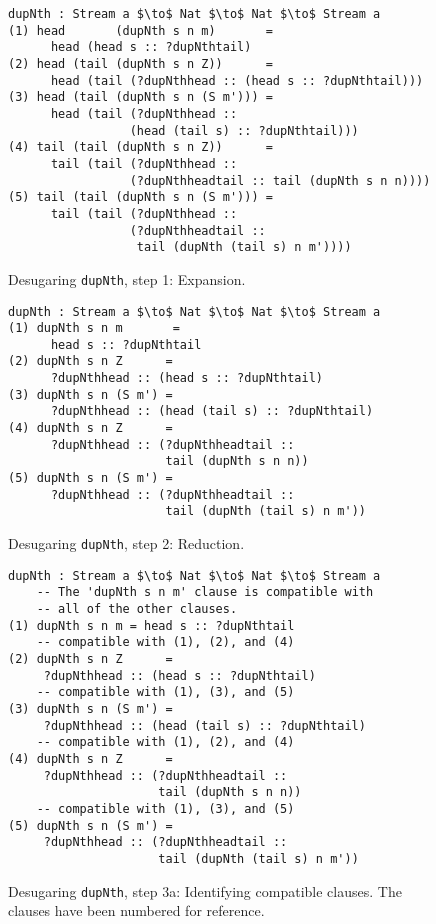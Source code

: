 \begin{figure}[h]
\begin{lstlisting}[mathescape,title=\idrisBlock]
    dupNth : Stream a $\to$ Nat $\to$ Nat $\to$ Stream a
(1) head       (dupNth s n m)       =
      head (head s :: ?dupNthtail)
(2) head (tail (dupNth s n Z))      = 
      head (tail (?dupNthhead :: (head s :: ?dupNthtail)))
(3) head (tail (dupNth s n (S m'))) =
      head (tail (?dupNthhead :: 
                 (head (tail s) :: ?dupNthtail)))
(4) tail (tail (dupNth s n Z))      =
      tail (tail (?dupNthhead :: 
                 (?dupNthheadtail :: tail (dupNth s n n))))
(5) tail (tail (dupNth s n (S m'))) =
      tail (tail (?dupNthhead :: 
                 (?dupNthheadtail :: 
                  tail (dupNth (tail s) n m'))))
\end{lstlisting}
  \caption{Desugaring \texttt{dupNth}, step 1: Expansion.}
  \label{fig:desugared_dupNth_step1}
\end{figure}

\begin{figure}[H]
\begin{lstlisting}[mathescape,title=\idrisBlock]
    dupNth : Stream a $\to$ Nat $\to$ Nat $\to$ Stream a
(1) dupNth s n m       =
      head s :: ?dupNthtail
(2) dupNth s n Z      = 
      ?dupNthhead :: (head s :: ?dupNthtail)
(3) dupNth s n (S m') =
      ?dupNthhead :: (head (tail s) :: ?dupNthtail)
(4) dupNth s n Z      =
      ?dupNthhead :: (?dupNthheadtail :: 
                      tail (dupNth s n n))
(5) dupNth s n (S m') =
      ?dupNthhead :: (?dupNthheadtail :: 
                      tail (dupNth (tail s) n m'))
\end{lstlisting}
  \caption{Desugaring \texttt{dupNth}, step 2: Reduction.}
  \label{fig:desugared_dupNth_step2}
\end{figure}

\begin{figure}[h]
\begin{lstlisting}[mathescape,title=\idrisBlock]
    dupNth : Stream a $\to$ Nat $\to$ Nat $\to$ Stream a
    -- The 'dupNth s n m' clause is compatible with 
    -- all of the other clauses.
(1) dupNth s n m = head s :: ?dupNthtail
    -- compatible with (1), (2), and (4)
(2) dupNth s n Z      = 
     ?dupNthhead :: (head s :: ?dupNthtail) 
    -- compatible with (1), (3), and (5)
(3) dupNth s n (S m') =
     ?dupNthhead :: (head (tail s) :: ?dupNthtail)
    -- compatible with (1), (2), and (4)
(4) dupNth s n Z      =
     ?dupNthhead :: (?dupNthheadtail :: 
                     tail (dupNth s n n))
    -- compatible with (1), (3), and (5)
(5) dupNth s n (S m') =
     ?dupNthhead :: (?dupNthheadtail :: 
                     tail (dupNth (tail s) n m'))
\end{lstlisting}
  \caption{Desugaring \texttt{dupNth}, step 3a: Identifying compatible
    clauses. The clauses have been numbered for reference.}
  \label{fig:desugared_dupNth_step3a}
\end{figure}

